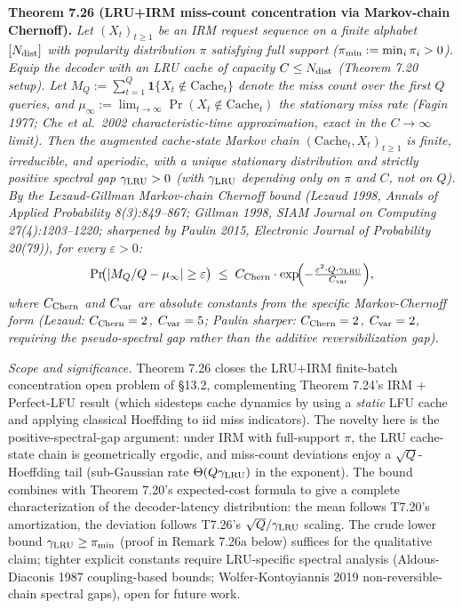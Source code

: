 \documentclass[
]{article}
\begin{document}
\textbf{Theorem 7.26 (LRU+IRM miss-count concentration via
Markov-chain Chernoff).} \emph{Let $(X_t)_{t \geq 1}$ be an IRM
request sequence on a finite alphabet $[N_{\rm dist}]$ with
popularity distribution $\pi$ satisfying full support
($\pi_{\rm min} := \min_i \pi_i > 0$). Equip the decoder with an LRU
cache of capacity $C \leq N_{\rm dist}$ (Theorem 7.20 setup). Let
$M_Q := \sum_{t=1}^{Q} \mathbf{1}\{X_t \notin \mathrm{Cache}_t\}$
denote the miss count over the first $Q$ queries, and $\mu_\infty
:= \lim_{t \to \infty} \Pr(X_t \notin \mathrm{Cache}_t)$ the
stationary miss rate (Fagin 1977; Che et al.\ 2002 characteristic-time
approximation, exact in the $C \to \infty$ limit). Then the
augmented cache-state Markov chain $(\mathrm{Cache}_t, X_t)_{t \geq
1}$ is finite, irreducible, and aperiodic, with a unique stationary
distribution and strictly positive spectral gap
$\gamma_{\rm LRU} > 0$ (with $\gamma_{\rm LRU}$ depending only on
$\pi$ and $C$, not on $Q$). By the Lezaud-Gillman Markov-chain
Chernoff bound (Lezaud 1998, Annals of Applied Probability
8(3):849--867; Gillman 1998, SIAM Journal on Computing
27(4):1203--1220; sharpened by Paulin 2015, Electronic Journal of
Probability 20(79)), for every $\varepsilon > 0$:
\[
  \Pr\!\bigl(|M_Q / Q - \mu_\infty| \geq \varepsilon\bigr)
  \;\leq\; C_{\rm Chern} \cdot \exp\!\Bigl( -\tfrac{\varepsilon^2
  \cdot Q \cdot \gamma_{\rm LRU}}{C_{\rm var}}\Bigr) ,
\]
where $C_{\rm Chern}$ and $C_{\rm var}$ are absolute constants
from the specific Markov-Chernoff form (Lezaud: $C_{\rm Chern} = 2$,
$C_{\rm var} = 5$; Paulin sharper: $C_{\rm Chern} = 2$, $C_{\rm var}
= 2$, requiring the pseudo-spectral gap rather than the additive
reversibilization gap).}

\emph{Scope and significance.} Theorem 7.26 closes the LRU+IRM
finite-batch concentration open problem of §13.2, complementing
Theorem 7.24's IRM + Perfect-LFU result (which sidesteps cache
dynamics by using a \emph{static} LFU cache and applying classical
Hoeffding to iid miss indicators). The novelty here is the
positive-spectral-gap argument: under IRM with full-support $\pi$,
the LRU cache-state chain is geometrically ergodic, and miss-count
deviations enjoy a $\sqrt{Q}$-Hoeffding tail (sub-Gaussian rate
$\Theta(Q \gamma_{\rm LRU})$ in the exponent). The bound combines
with Theorem 7.20's expected-cost formula to give a complete
characterization of the decoder-latency distribution: the mean
follows T7.20's amortization, the deviation follows T7.26's
$\sqrt{Q}/\gamma_{\rm LRU}$ scaling. The crude lower bound
$\gamma_{\rm LRU} \geq \pi_{\rm min}$ (proof in Remark 7.26a below)
suffices for the qualitative claim; tighter explicit constants
require LRU-specific spectral analysis (Aldous-Diaconis 1987
coupling-based bounds; Wolfer-Kontoyiannis 2019 non-reversible-chain
spectral gaps), open for future work.
\end{document}
